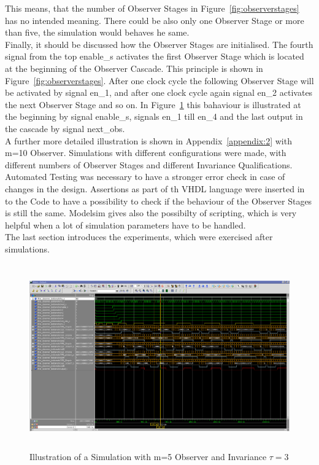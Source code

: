 This means, that the number of Observer Stages in Figure~\ref{fig:observerstages} has no intended meaning. 
There could be also only one Observer Stage or more than five, the simulation would behaves he same. \\  
Finally, it should be discussed how the Observer Stages are initialised. The fourth signal from the top enable\_s activates the first Observer Stage which is located at the beginning of the 
Observer Cascade. This principle is shown in Figure~\ref{fig:observerstages}. 
After one clock cycle the following Observer Stage will be activated by signal en\_1, and after one clock cycle again signal en\_2 activates the next Observer Stage and so on. 
In Figure~\ref{fig:simulation:five} this bahaviour is illustrated at the beginning by signal enable\_s, signals en\_1 till en\_4 and the last output in the cascade by signal next\_obs. \\

A further more detailed illustration is shown in Appendix~\ref{appendix:2} with m=10 Observer. 
Simulations with different configurations were made, with different numbers of Observer Stages and different Invariance Qualifications. 
Automated Testing was necessary to have a stronger error check in case of changes in the design. 
Assertions as part of th VHDL language were inserted in to the Code to have a possibility to check if the behaviour of the Observer Stages is still the same. 
Modelsim gives also the possibilty of scripting,  which is very helpful when a lot of simulation parameters have to be handled. \\
The last section introduces the experiments, which were exercised after simulations.  


\begin{figure}[]
\centering
\includegraphics[width=650px,height=300px,angle=-90]{../../pictures/Modelsim/5_Observer_tb_1.png}
\caption[Modelsim Simulation of 5 Observer]{Illustration of a Simulation with m=5 Observer and Invariance $\tau=3$}
\label{fig:simulation:five}
\end{figure}

